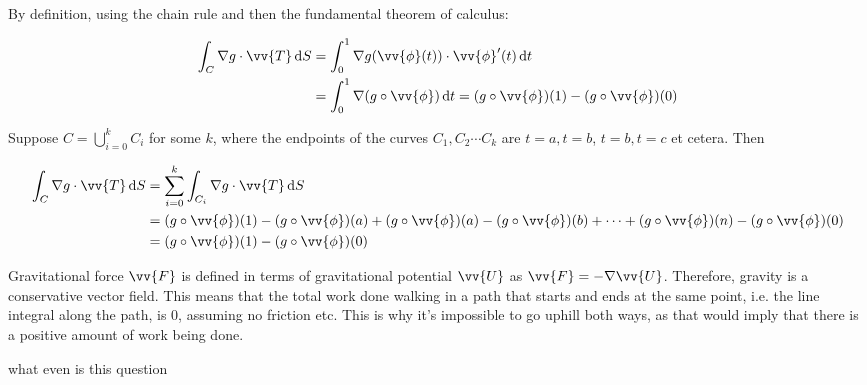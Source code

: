 
By definition, using the chain rule and then the fundamental theorem of calculus:

\begin{align*}
  \int_C \nabla g \cdot \vv{T} \diff S &= \int_0^1 \nabla g(\vv{\phi}(t)) \cdot \vv{\phi}'(t) \diff t \\
  &= \int_0^1 \nabla (g \circ \vv{\phi}) \diff t = (g \circ \vv{\phi})(1) - (g \circ \vv{\phi})(0)
\end{align*}

Suppose $C = \bigcup_{i = 0}^k C_i$ for some $k$, where the endpoints of the curves $C_1, C_2 \cdots C_k$ are $t = a, t = b$, $t = b, t = c$ et cetera. Then

\begin{align*}
  \int_C \nabla g \cdot \vv{T} \diff S &= \sum_{i = 0}^k \int_{C_i} \nabla g \cdot \vv{T} \diff S \\
  &= (g \circ \vv{\phi})(1) - (g \circ \vv{\phi})(a) + (g \circ \vv{\phi})(a) - (g \circ \vv{\phi})(b) + \cdots + (g \circ \vv{\phi})(n) - (g \circ \vv{\phi})(0) \\
  &= (g \circ \vv{\phi})(1) - (g \circ \vv{\phi})(0)
\end{align*}

Gravitational force $\vv{F}$ is defined in terms of gravitational potential $\vv{U}$ as $\vv{F} = -\nabla \vv{U}$. Therefore, gravity is a conservative vector field. This means that the total work done walking in a path that starts and ends at the same point, i.e. the line integral along the path, is $0$, assuming no friction etc. This is why it's impossible to go uphill both ways, as that would imply that there is a positive amount of work being done.

what even is this question


